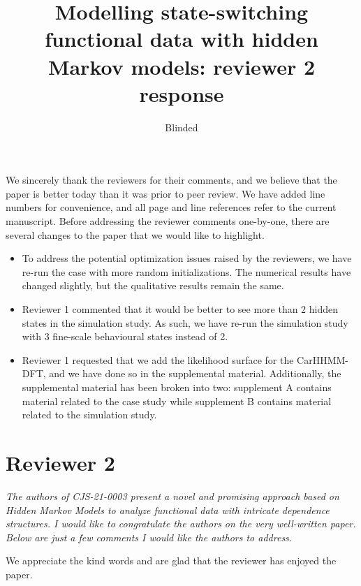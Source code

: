 \documentclass{article}
\begin{document}
\title{Modelling state-switching functional data with hidden Markov models: reviewer 2 response}
\date{}
\author{Blinded}

\maketitle

We sincerely thank the reviewers for their comments, and we believe that the paper is better today than it was prior to peer review. We have added line numbers for convenience, and all page and line references refer to the current manuscript. Before addressing the reviewer comments one-by-one, there are several changes to the paper that we would like to highlight.

\begin{itemize}
    \item To address the potential optimization issues raised by the reviewers, we have re-run the case with more random initializations. The numerical results have changed slightly, but the qualitative results remain the same.
    \item Reviewer 1 commented that it would be better to see more than 2 hidden states in the simulation study. As such, we have re-run the simulation study with 3 fine-scale behavioural states instead of 2.
    \item Reviewer 1 requested that we add the likelihood surface for the CarHHMM-DFT, and we have done so in the supplemental material. Additionally, the supplemental material has been broken into two: supplement A contains material related to the case study while supplement B contains material related to the simulation study. 
\end{itemize}

\section*{Reviewer 2}

\textit{The authors of CJS-21-0003 present a novel and promising approach based on Hidden Markov Models to analyze functional data with intricate dependence structures. I would like to congratulate the authors on the very well-written paper. Below are just a few comments I would like the authors to address.}

We appreciate the kind words and are glad that the reviewer has enjoyed the paper.
\end{document}
